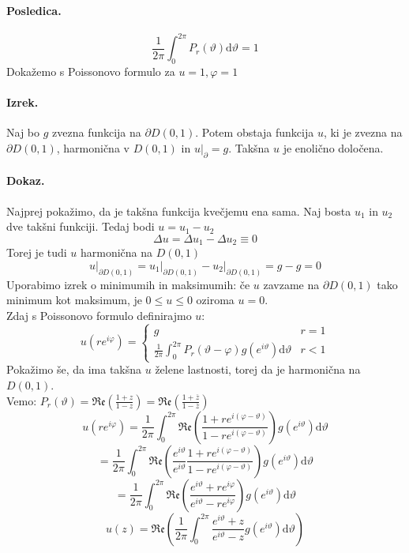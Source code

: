 \documentclass[a4paper]{article}
\newcommand{\dif}{\mathrm{d}}
\begin{document}
\paragraph{Posledica.} $$\frac{1}{2\pi} \int_{0}^{2\pi} P_r(\vartheta)\dif\vartheta = 1$$
Dokažemo s Poissonovo formulo za $u = 1, \varphi = 1$
\paragraph{Izrek.} Naj bo $g$ zvezna funkcija na $\partial D(0, 1)$. Potem obstaja funkcija $u$, ki je zvezna na $\partial D(0, 1)$, harmonična v $D(0, 1)$ in $u\Big|_{\partial} = g$. Takšna $u$ je enolično določena.
\paragraph{Dokaz.} Najprej pokažimo, da je takšna funkcija kvečjemu ena sama. Naj bosta $u_1$ in $u_2$ dve takšni funkciji.
Tedaj bodi $u = u_1 - u_2$
$$\Delta u = \Delta u_1 - \Delta u_2 \equiv 0$$
Torej je tudi $u$ harmonična na $D(0, 1)$
$$u\Big|_{\partial D(0, 1)} = u_1\Big|_{\partial D(0, 1)} - u_2\Big|_{\partial D(0, 1)} = g - g = 0$$
Uporabimo izrek o minimumih in maksimumih: če $u$ zavzame na $\partial D(0, 1)$ tako minimum kot maksimum, je $0 \leq u \leq 0$ oziroma $u=0$. \\
Zdaj s Poissonovo formulo definirajmo $u$: \\[2mm]
$$u(re^{i\varphi}) = \begin{cases}
    g & r = 1 \\
    \frac{1}{2\pi} \int_{0}^{2\pi} P_r(\vartheta - \varphi) g(e^{i\vartheta})\dif\vartheta & r < 1
\end{cases}$$
Pokažimo še, da ima takšna $u$ želene lastnosti, torej da je harmonična na $D(0, 1)$. \\
Vemo: $\displaystyle{P_r (\vartheta) = \mathfrak{Re}\left(\frac{1+z}{1-z}\right) = \mathfrak{Re}\left(\frac{1+\overline{z}}{1 - \overline{z}}\right)}$
$$u(re^{i\varphi}) = \frac{1}{2\pi} \int_{0}^{2\pi} \mathfrak{Re}\left(\frac{1 + re^{i(\varphi - \vartheta)}}{1 - re^{i(\varphi - \vartheta)}}\right)g(e^{i\vartheta})\dif\vartheta$$
$$= \frac{1}{2\pi} \int_{0}^{2\pi} \mathfrak{Re}\left(\frac{e^{i\vartheta}}{e^{i\vartheta}}\frac{1 + re^{i(\varphi - \vartheta)}}{1 - re^{i(\varphi - \vartheta)}}\right)g(e^{i\vartheta})\dif\vartheta$$
$$= \frac{1}{2\pi} \int_{0}^{2\pi} \mathfrak{Re}\left(\frac{e^{i\vartheta} + re^{i\varphi}}{e^{i\vartheta} - re^{i\varphi}}\right)g(e^{i\vartheta})\dif\vartheta$$
$$u(z) = \mathfrak{Re}\left(\frac{1}{2\pi} \int_{0}^{2\pi} \frac{e^{i\vartheta} + z}{e^{i\vartheta} - z}g(e^{i\vartheta}) \dif\vartheta\right)$$
\end{document}
